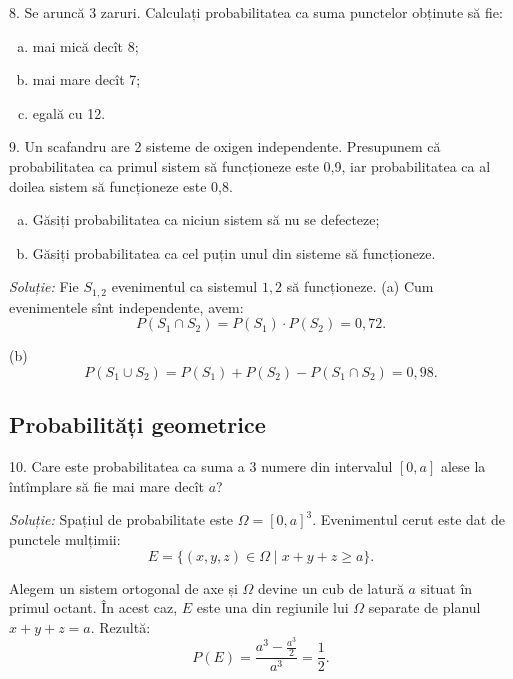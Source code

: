 \vspace{0.3cm}

8. Se aruncă 3 zaruri. Calculați probabilitatea ca suma punctelor obținute să fie:
\begin{enumerate}[(a)]
\item mai mică decît 8;
\item mai mare decît 7;
\item egală cu 12.
\end{enumerate}

\vspace{0.3cm}

9. Un scafandru are 2 sisteme de oxigen independente. Presupunem că
probabilitatea ca primul sistem să funcționeze este 0,9, iar probabilitatea ca
al doilea sistem să funcționeze este 0,8.
\begin{enumerate}[(a)]
\item Găsiți probabilitatea ca niciun sistem să nu se defecteze;
\item Găsiți probabilitatea ca cel puțin unul din sisteme să funcționeze.
\end{enumerate}

\emph{Soluție:} Fie $ S_{1,2} $ evenimentul ca sistemul $ 1, 2 $ să funcționeze.
(a) Cum evenimentele sînt independente, avem:
\[
  P(S_1 \cap S_2) = P(S_1) \cdot P(S_2) = 0,72.
\]

(b) \[
  P(S_1 \cup S_2) = P(S_1) + P(S_2) - P(S_1 \cap S_2) = 0,98.
\]



\subsection{Probabilități geometrice}

10. Care este probabilitatea ca suma a 3 numere din intervalul $ [0, a] $ alese la
întîmplare să fie mai mare decît $ a $?

\emph{Soluție:} Spațiul de probabilitate este $ \Omega = [0, a]^3 $. Evenimentul
cerut este dat de punctele mulțimii:
\[
  E = \{ (x, y, z) \in \Omega \mid x + y + z \geq a \}.
\]

Alegem un sistem ortogonal de axe și $ \Omega $ devine un cub de latură $ a $
situat în primul octant. În acest caz, $ E $ este una din regiunile lui $ \Omega $
separate de planul $ x + y + z = a $. Rezultă:
\[
  P(E) = \frac{a^3 - \frac{a^3}{2}}{a^3} = \frac{1}{2}.
\]

\vspace{0.3cm}

